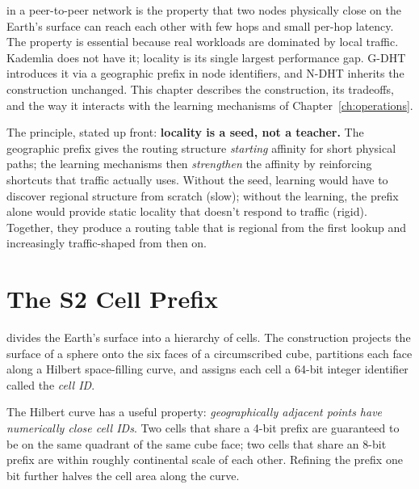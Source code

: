 \documentclass[twoside,nobib]{tufte-book}
\newcommand{\NDHT}{N-DHT\xspace}
\newcommand{\GDHT}{G-DHT\xspace}
\begin{document}
 in a peer-to-peer network is the property
that two nodes physically close on the Earth's surface can
reach each other with few hops and small per-hop latency. The
property is essential because real workloads are dominated by
local traffic. Kademlia does not have it; locality is its
single largest performance gap. \GDHT introduces it via a
geographic prefix in node identifiers, and \NDHT inherits the
construction unchanged. This chapter describes the construction,
its tradeoffs, and the way it interacts with the
learning mechanisms of Chapter~\ref{ch:operations}.

The principle, stated up front: \textbf{locality is a seed, not a
teacher.} The geographic prefix gives the routing structure
\emph{starting} affinity for short physical paths; the learning
mechanisms then \emph{strengthen} the affinity by reinforcing
shortcuts that traffic actually uses. Without the seed, learning
would have to discover regional structure from scratch (slow);
without the learning, the prefix alone would provide static
locality that doesn't respond to traffic (rigid). Together, they
produce a routing table that is regional from the first lookup
and increasingly traffic-shaped from then on.

\section{The S2 Cell Prefix}

 divides the
Earth's surface into a hierarchy of cells. The construction
projects the surface of a sphere onto the six faces of a
circumscribed cube, partitions each face along a Hilbert
space-filling curve, and assigns each cell a 64-bit integer
identifier called the \emph{cell ID}.

The Hilbert curve has a useful property: \emph{geographically
adjacent points have numerically close cell IDs}. Two cells
that share a 4-bit prefix are guaranteed to be on the same
quadrant of the same cube face; two cells that share an 8-bit
prefix are within roughly continental scale of each other.
Refining the prefix one bit further halves the cell area along
the curve.
\end{document}
